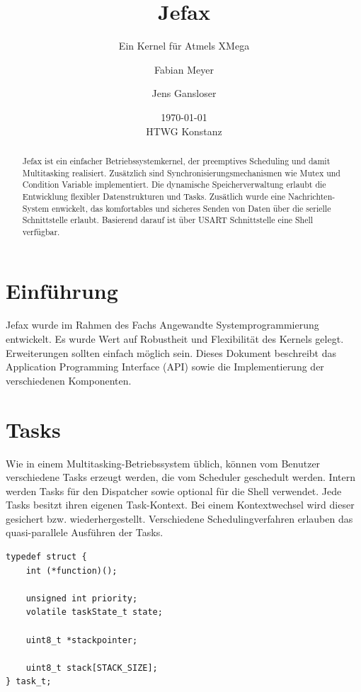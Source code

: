 \documentclass[fontsize=12pt, toc=bibliography, notitlepage]{scrreprt}
\title{Jefax}
\subtitle{Ein Kernel für Atmels XMega}
\author{Fabian Meyer \and Jens Gansloser}
\date{\today \\ HTWG Konstanz}
\begin{document}
\maketitle

\begin{abstract}
Jefax ist ein einfacher Betriebssystemkernel, der preemptives Scheduling und damit Multitasking realisiert. Zusätzlich sind Synchronisierungsmechanismen wie Mutex und Condition Variable implementiert. Die dynamische Speicherverwaltung erlaubt die Entwicklung flexibler Datenstrukturen und Tasks. Zusätlich wurde eine Nachrichten-System enwickelt, das komfortables und sicheres Senden von Daten über die serielle Schnittstelle erlaubt. Basierend darauf ist über USART Schnittstelle eine Shell verfügbar.
\end{abstract}
\clearpage

\tableofcontents

\chapter{Einführung}
\label{chap:intro}
Jefax wurde im Rahmen des Fachs Angewandte Systemprogrammierung entwickelt. Es wurde Wert auf Robustheit und Flexibilität des Kernels gelegt. Erweiterungen sollten einfach möglich sein. Dieses Dokument beschreibt das Application Programming Interface (API) sowie die Implementierung der verschiedenen Komponenten.

\chapter{Tasks}
\label{chap:tasks}
Wie in einem Multitasking-Betriebssystem üblich, können vom Benutzer verschiedene Tasks erzeugt werden, die vom Scheduler geschedult werden. Intern werden Tasks für den Dispatcher sowie optional für die Shell verwendet. Jede Tasks besitzt ihren eigenen Task-Kontext. Bei einem Kontextwechsel wird dieser gesichert bzw. wiederhergestellt. Verschiedene Schedulingverfahren erlauben das quasi-parallele Ausführen der Tasks.\\

\begin{lstlisting}[title=task.h]
typedef struct {
	int (*function)();

	unsigned int priority;
	volatile taskState_t state;

	uint8_t *stackpointer;

	uint8_t stack[STACK_SIZE];
} task_t;
\end{lstlisting}
\end{document}
